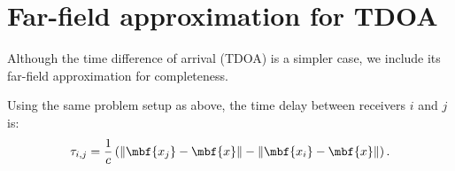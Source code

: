 \section{Far-field approximation for TDOA}
Although the time difference of arrival (TDOA) is a simpler case, we include its far-field approximation for completeness.

Using the same problem setup as above, the time delay between receivers $i$ and $j$ is:
\begin{align*}
  \tau_{i,j} = \frac{1}{c}\left(\|\mbf{x_j}-\mbf{x}\| - \|\mbf{x_i}-\mbf{x}\|\right).  
\end{align*}
